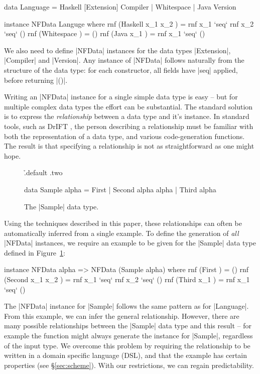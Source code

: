\documentclass{llncs}
\begin{document}
\begin{code}
data Language  =  Haskell [Extension] Compiler
               |  Whitespace
               |  Java Version

instance NFData Languge where
    rnf (Haskell x_1 x_2  ) = rnf x_1 `seq` rnf x_2 `seq` ()
    rnf (Whitespace       ) = ()
    rnf (Java x_1         ) = rnf x_1 `seq` ()
\end{code}

We also need to define |NFData| instances for the data types |Extension|, |Compiler| and |Version|. Any instance of |NFData| follows naturally from the structure of the data type: for each constructor, all fields have |seq| applied, before returning |()|.

Writing an |NFData| instance for a single simple data type is easy -- but for multiple complex data types the effort can be substantial. The standard solution is to express the \textit{relationship} between a data type and it's instance. In standard tools, such as DrIFT \cite{drift}, the person describing a relationship must be familiar with both the representation of a data type, and various code-generation functions. The result is that specifying a relationship is not as straightforward as one might hope.

\begin{figure}
\h{.default .two}\begin{code}
data Sample alpha  =  First
                   |  Second  alpha alpha
                   |  Third   alpha
\end{code}
\caption{The |Sample| data type.}
\label{fig:sample}
\end{figure}

Using the techniques described in this paper, these relationships can often be automatically inferred from a single example. To define the generation of \textit{all} |NFData| instances, we require an example to be given for the |Sample| data type defined in Figure~\ref{fig:sample}:

\begin{code}
instance NFData alpha => NFData (Sample alpha) where
    rnf (First           ) = ()
    rnf (Second x_1 x_2  ) = rnf x_1 `seq` rnf x_2 `seq` ()
    rnf (Third x_1       ) = rnf x_1 `seq` ()
\end{code}

The |NFData| instance for |Sample| follows the same pattern as for |Language|. From this example, we can infer the general relationship. However, there are many possible relationships between the |Sample| data type and this result -- for example the function might always generate the instance for |Sample|, regardless of the input type. We overcome this problem by requiring the relationship to be written in a domain specific language (DSL), and that the example has certain properties (see \S\ref{sec:scheme}). With our restrictions, we can regain predictability.
\end{document}
